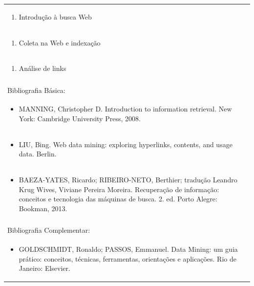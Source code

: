 \documentclass[11pt]{article}
\begin{document}
\begin{center}
\begin{longtable}{|p{4cm}|p{4cm}|p{4cm}|p{4cm}|}
\multicolumn{4}{|p{\dimexpr 16cm + 6\tabcolsep\relax}|}{\begin{enumerate}[start=11]\item Introdução à busca Web\end{enumerate}}\\
\multicolumn{4}{|p{\dimexpr 16cm + 6\tabcolsep\relax}|}{\begin{enumerate}[start=12]\item Coleta na Web e indexação\end{enumerate}}\\
\multicolumn{4}{|p{\dimexpr 16cm + 6\tabcolsep\relax}|}{\begin{enumerate}[start=13]\item Análise de links\end{enumerate}}\\
\multicolumn{4}{|p{\dimexpr 16cm + 6\tabcolsep\relax}|}{}\\
\hline
\multicolumn{4}{|p{16cm}|}{Bibliografia Básica:}\\*
\multicolumn{4}{|p{\dimexpr 16cm + 6\tabcolsep\relax}|}{\begin{itemize}\item MANNING, Christopher D. Introduction to information retrieval. New York: Cambridge University Press, 2008.\end{itemize}}\\
\multicolumn{4}{|p{\dimexpr 16cm + 6\tabcolsep\relax}|}{\begin{itemize}\item LIU, Bing. Web data mining: exploring hyperlinks, contents, and usage data. Berlin.\end{itemize}}\\
\multicolumn{4}{|p{\dimexpr 16cm + 6\tabcolsep\relax}|}{\begin{itemize}\item BAEZA-YATES, Ricardo; RIBEIRO-NETO, Berthier; tradução Leandro Krug Wives, Viviane Pereira Moreira. Recuperação de informação: conceitos e tecnologia das máquinas de busca. 2. ed. Porto Alegre: Bookman, 2013.\end{itemize}}\\
\multicolumn{4}{|p{16cm}|}{}\\
\hline
\multicolumn{4}{|p{16cm}|}{Bibliografia Complementar:}\\*
\multicolumn{4}{|p{\dimexpr 16cm + 6\tabcolsep\relax}|}{\begin{itemize}\item GOLDSCHMIDT, Ronaldo; PASSOS, Emmanuel. Data Mining: um guia prático: conceitos, técnicas, ferramentas, orientações e aplicações. Rio de Janeiro: Elsevier.\end{itemize}}\\

\end{longtable}
\end{center}
\end{document}
